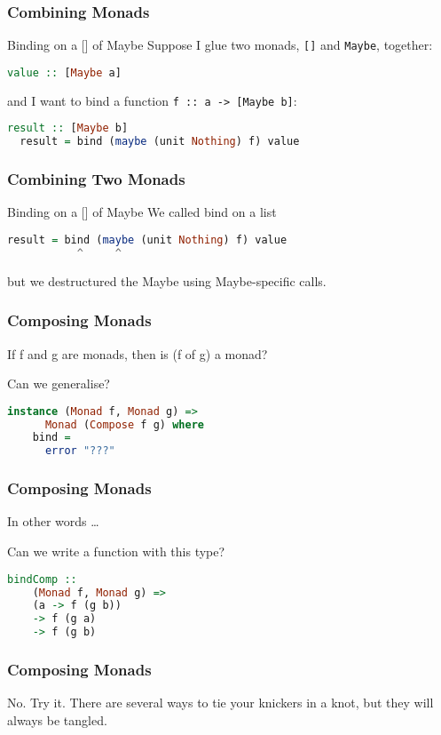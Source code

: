\begin{frame}[fragile]
\frametitle{Combining Monads}
\begin{block}{Binding on a [] of Maybe}
Suppose I glue two monads, \lstinline$[]$ and \lstinline$Maybe$, together:
\begin{lstlisting}[language=haskell]
  value :: [Maybe a]
\end{lstlisting}
and I want to bind a function \lstinline$f :: a -> [Maybe b]$:
\begin{lstlisting}[language=haskell]
  result :: [Maybe b]
  result = bind (maybe (unit Nothing) f) value
\end{lstlisting}
\end{block}
\end{frame}

\begin{frame}[fragile]
\frametitle{Combining Two Monads}
\begin{block}{Binding on a [] of Maybe}
We called bind on a list 
\begin{lstlisting}[language=haskell]
  result = bind (maybe (unit Nothing) f) value
           ^     ^      
\end{lstlisting}
but we destructured the Maybe using Maybe-specific calls.
\end{block}
\end{frame}

\begin{frame}[fragile]
\frametitle{Composing Monads}
If f and g are monads, then is (f of g) a monad?
\begin{block}{Can we generalise?}
\begin{lstlisting}[language=haskell]
  instance (Monad f, Monad g) =>
      Monad (Compose f g) where
    bind =
      error "???"
\end{lstlisting}
\end{block}
\end{frame}

\begin{frame}[fragile]
\frametitle{Composing Monads}
In other words \ldots
\begin{block}{Can we write a function with this type?}
\begin{lstlisting}[language=haskell]
  bindComp ::
    (Monad f, Monad g) =>
    (a -> f (g b))
    -> f (g a)
    -> f (g b)
\end{lstlisting}
\end{block}
\end{frame}

\begin{frame}[fragile]
\frametitle{Composing Monads}
\begin{block}{No. Try it.}
There are several ways to tie your knickers in a knot, but they will always be tangled.
\end{block}
\end{frame}

